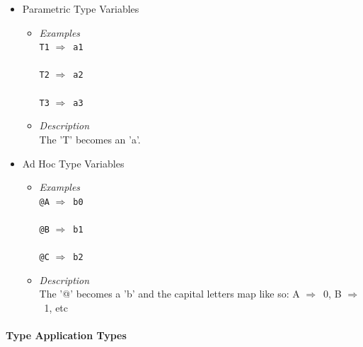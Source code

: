 \documentclass[diploma]{softlab-thesis}
\def\lra{$\Longrightarrow$\ }
\begin{document}
\begin{itemize}

\item
Parametric Type Variables

\begin{itemize}

\item
\textit{Examples}\\

\verb|T1| \lra \verb|a1|\\\\
\verb|T2| \lra \verb|a2|\\\\
\verb|T3| \lra \verb|a3|\\

\item
\textit{Description}\\

The 'T' becomes an 'a'.
\end{itemize}

\item
Ad Hoc Type Variables

\begin{itemize}
\item
\textit{Examples}\\

\verb|@A| \lra \verb|b0|\\\\
\verb|@B| \lra \verb|b1|\\\\
\verb|@C| \lra \verb|b2|\\
\item
\textit{Description}\\

The '@' becomes a 'b' and the capital letters map like so:
A \lra 0, B \lra 1, etc
\end{itemize}

\end{itemize}

\newpage
\paragraph{Type Application Types}
\end{document}
